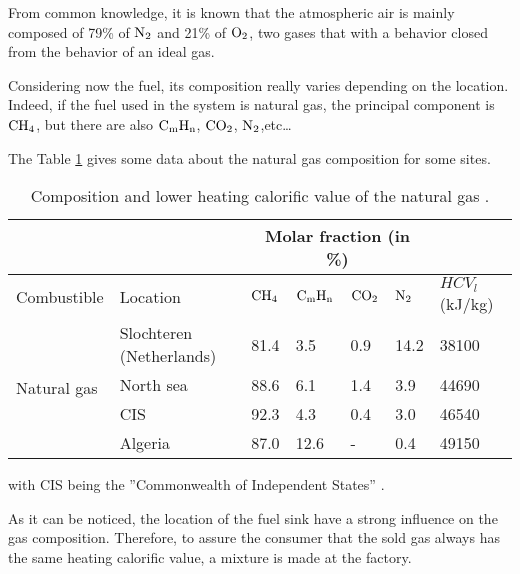 From common knowledge, it is known that the atmospheric air is mainly composed of 79\% of $\ce{N2}$ and 21\% of $\ce{O2}$, two gases that with a behavior closed from the behavior of an ideal gas.

Considering now the fuel, its composition really varies depending on the location. Indeed, if the fuel used in the system is natural gas, the principal component is $\ce{CH4}$, but there are also $\ce{C}_\text{m}\ce{H}_\text{n}$, $\ce{CO2}$, $\ce{N2}$,etc\dots

The Table \ref{tab:C7_compgas} gives some data about the natural gas composition for some sites.


\begin{table}[h]
\centering
\begin{tabular}{ll|lllll}
                                &                                       & \multicolumn{4}{c}{Molar fraction (in \%)}                            &                 \\ \hline
Combustible                  & Location                              & $\ce{CH4}$ & $\ce{C}_\text{m}\ce{H}_\text{n}$ & $\ce{CO2}$ & $\ce{N2}$ & $HCV_l$ (kJ/kg) \\ \hline
\multirow{4}{*}{Natural gas} & Slochteren (Netherlands)              & 81.4       & 3.5                              & 0.9        & 14.2      & 38100           \\
                                & North sea                             & 88.6       & 6.1                              & 1.4        & 3.9       & 44690           \\
                                & CIS & 92.3       & 4.3                              & 0.4        & 3.0       & 46540           \\
                                & Algeria                               & 87.0       & 12.6                             & -          & 0.4       & 49150          
\end{tabular}
\caption{Composition and lower heating calorific value of the natural gas \cite{Leonard2018}.}
\label{tab:C7_compgas}
\end{table}
with CIS being the ''Commonwealth of Independent States'' \cite{EncyclopaediaBritannica2018}.

As it can be noticed, the location of the fuel sink have a strong influence on the gas composition. Therefore, to assure the consumer that the sold gas always has the same heating calorific value, a mixture is made at the factory. 

